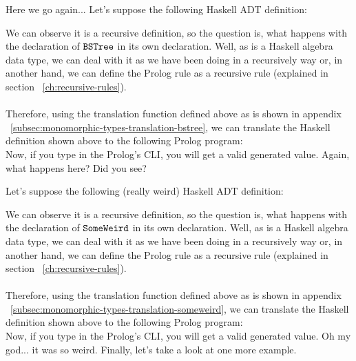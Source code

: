 \begin{example}
	Here we go again... Let's suppose the following Haskell ADT definition:
	
	We can observe it is a recursive definition, so the question is, what happens with the declaration of $\texttt{BSTree}$ in its own declaration. Well, as  is a Haskell algebra data type, we can deal with it as we have been doing in a recursively way or, in another hand, we can define the Prolog rule as a recursive rule (explained in section ~\ref{ch:recursive-rules}).\\\\
	Therefore, using the translation function defined above as is shown in appendix ~\ref{subsec:monomorphic-types-translation-bstree}, we can translate the Haskell definition shown above to the following Prolog program:\\
	
	Now, if you type  in the Prolog's CLI, you will get a valid  generated value. Again, what happens here? Did you see?\\
\end{example}
\begin{example}[SomeWeird]
	Let's suppose the following (really weird) Haskell ADT definition:
	
	We can observe it is a recursive definition, so the question is, what happens with the declaration of $\texttt{SomeWeird}$ in its own declaration. Well, as  is a Haskell algebra data type, we can deal with it as we have been doing in a recursively way or, in another hand, we can define the Prolog rule as a recursive rule (explained in section ~\ref{ch:recursive-rules}).\\\\
	Therefore, using the translation function defined above as is shown in appendix ~\ref{subsec:monomorphic-types-translation-someweird}, we can translate the Haskell definition shown above to the following Prolog program:\\
	
	Now, if you type  in the Prolog's CLI, you will get a valid  generated value. Oh my god... it was so weird. Finally, let's take a look at one more example.\\
\end{example}
